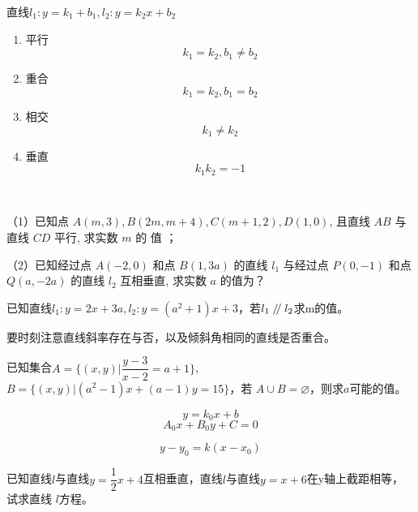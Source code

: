 \begin{corollary}
    直线\(l_1:y=k_1+b_1,l_2:y=k_2x+b_2\)
\begin{enumerate}
    \item 平行
    \begin{equation}
        k_1=k_2,b_1\neq b_2
    \end{equation}
    \item 重合
    \begin{equation}
        k_1=k_2,b_1= b_2
    \end{equation}
    \item 相交
    \begin{equation}
        k_1\neq k_2
    \end{equation}
    \item 垂直
    \begin{equation}
        k_1k_2=-1
    \end{equation}
\end{enumerate}
\end{corollary}
\begin{example}
\ 

（1）已知点 $ A(m, 3), B(2 m, m+4), C(m+1,2), D(1,0) $, 且直线 $ A B $ 与直线 $ C D$  平行, 求实数  $m $ 的 值  ；

（2）已知经过点 $ A(-2,0) $ 和点  $B(1,3 a)$  的直线  $l_{1} $ 与经过点 $ P(0,-1)$ 和点  $Q(a,-2 a)$  的直线 $ l_{2} $ 互相垂直, 求实数  $a$  的值为？
\end{example}
\begin{exercise}
    已知直线\(l_1:y=2x+3a,l_2:y=(a^2+1)x+3\)，若\(l_1\kern 0.56em/\kern -0.8em /\kern 0.56em l_2\)求m的值。
\end{exercise}


\begin{att}
    要时刻注意直线斜率存在与否，以及倾斜角相同的直线是否重合。
\end{att}
\begin{example}
    已知集合\(A=\{(x,y)|\dfrac{y-3}{x-2}=a+1\}\),\(B=\{(x,y)|(a^2-1)x+(a-1)y=15\}\)，若
    \(A\cup B=\varnothing \)，则求\(a\)可能的值。
\end{example}

\begin{definition}[平行直线束]
    \begin{equation}
        y=k_0x+b
    \end{equation}
    \begin{equation}
        A_0x+B_0y+C=0
    \end{equation}
\end{definition}
\begin{definition}[过定点的直线束]
    \begin{equation}
        y-y_0=k(x-x_0)
    \end{equation}
\end{definition}
\begin{example}
    已知直线\(l\)与直线\(y=\dfrac{1}{2}x+4\)互相垂直，直线\(l\)与直线\(y=x+6\)在y轴上截距相等，试求直线
    \(l\)方程。
\end{example}
\clearpage

